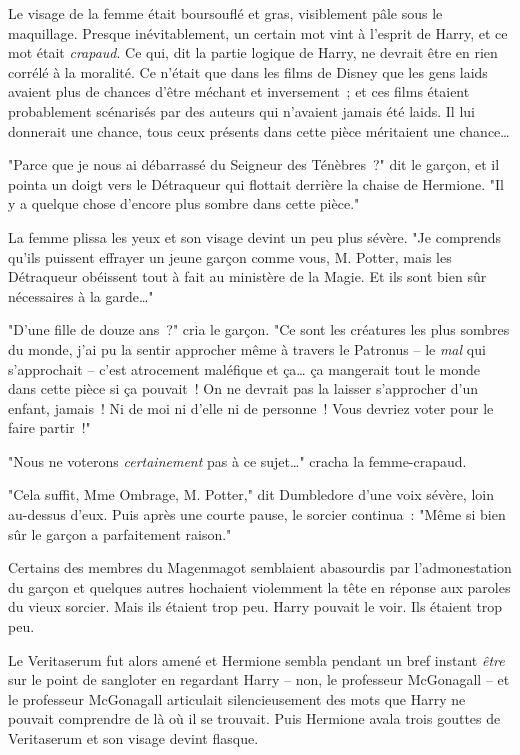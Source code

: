 Le visage de la femme était boursouflé et gras, visiblement pâle sous le maquillage. Presque inévitablement, un certain mot vint à l'esprit de Harry, et ce mot était \emph{crapaud}. Ce qui, dit la partie logique de Harry, ne devrait être en rien corrélé à la moralité. Ce n'était que dans les films de Disney que les gens laids avaient plus de chances d'être méchant et inversement~; et ces films étaient probablement scénarisés par des auteurs qui n'avaient jamais été laids. Il lui donnerait une chance, tous ceux présents dans cette pièce méritaient une chance…

"Parce que je nous ai débarrassé du Seigneur des Ténèbres~?" dit le garçon, et il pointa un doigt vers le Détraqueur qui flottait derrière la chaise de Hermione. "Il y a quelque chose d'encore plus sombre dans cette pièce."

La femme plissa les yeux et son visage devint un peu plus sévère. "Je comprends qu'ils puissent effrayer un jeune garçon comme vous, M. Potter, mais les Détraqueur obéissent tout à fait au ministère de la Magie. Et ils sont bien sûr nécessaires à la garde…"

"D'une fille de douze ans~?" cria le garçon. "Ce sont les créatures les plus sombres du monde, j'ai pu la sentir approcher même à travers le Patronus -- le \emph{mal} qui s'approchait -- c'est atrocement maléfique et ça… ça mangerait tout le monde dans cette pièce si ça pouvait~! On ne devrait pas la laisser s'approcher d'un enfant, jamais~! Ni de moi ni d'elle ni de personne~! Vous devriez voter pour le faire partir~!"

"Nous ne voterons \emph{certainement} pas à ce sujet…" cracha la femme-crapaud.

"Cela suffit, Mme Ombrage, M. Potter," dit Dumbledore d'une voix sévère, loin au-dessus d'eux. Puis après une courte pause, le sorcier continua~: "Même si bien sûr le garçon a parfaitement raison."

Certains des membres du Magenmagot semblaient abasourdis par l'admonestation du garçon et quelques autres hochaient violemment la tête en réponse aux paroles du vieux sorcier. Mais ils étaient trop peu. Harry pouvait le voir. Ils étaient trop peu.

Le Veritaserum fut alors amené et Hermione sembla pendant un bref instant \emph{être} sur le point de sangloter en regardant Harry -- non, le professeur McGonagall -- et le professeur McGonagall articulait silencieusement des mots que Harry ne pouvait comprendre de là où il se trouvait. Puis Hermione avala trois gouttes de Veritaserum et son visage devint flasque.


